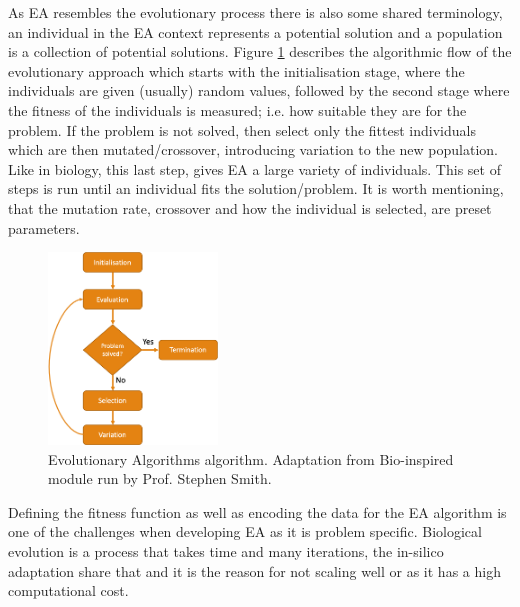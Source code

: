 
As EA resembles the evolutionary process there is also some shared terminology, an individual in the EA context represents a potential solution and a population is a collection of potential solutions.  Figure \ref{fig:ea_basic} describes the algorithmic flow of the evolutionary approach which starts with the initialisation stage, where the individuals are given (usually) random values, followed by the second stage where the fitness of the individuals is measured; i.e. how suitable they are for the problem. If the problem is not solved, then select only the fittest individuals which are then mutated/crossover, introducing variation to the new population. Like in biology, this last step, gives EA a large variety of individuals. This set of steps is run until an individual fits the solution/problem. It is worth mentioning, that the mutation rate, crossover and how the individual is selected, are preset parameters. 

\begin{figure}[!htb]
  \centering\includegraphics[width=0.4\textwidth,height=0.4\textheight,keepaspectratio]{Images/Resources/EA_basic.png}
    \caption{Evolutionary Algorithms algorithm. Adaptation from Bio-inspired module run by Prof. Stephen Smith. \cite{Smith_undated-sn}}
    \label{fig:ea_basic}
\end{figure}
\FloatBarrier


Defining the fitness function as well as encoding the data for the EA algorithm is one of the challenges when developing EA as it is problem specific. Biological evolution is a process that takes time and many iterations, the in-silico adaptation share that and it is the reason for not scaling well or as it has a high computational cost.

